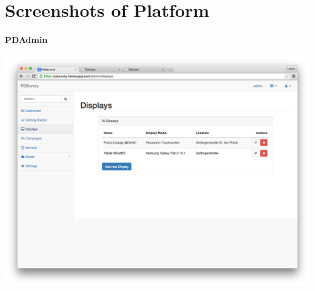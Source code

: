 











\clearpage

\label{appendix:interviews}

  
  \label{appendix:interview-participant}

  
  \label{appendix:interview-passerby}

  
  \label{appendix:semi-structured-interview}





\cleardoublepage
\section{Screenshots of Platform}




\paragraph{PDAdmin}


 \label{screenshot:pdadmin-displays}
    \begin{center}
        \includegraphics[width=\columnwidth]{img/screenshots/pdadmin/displays.png}
    \end{center}


